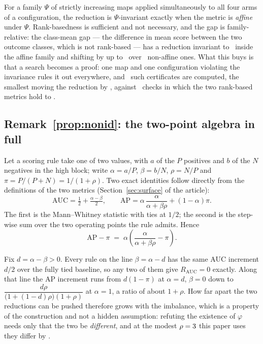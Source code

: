 \begin{remark}
\label{prop:rank}
For a family $\Psi$ of strictly increasing maps applied simultaneously to all
four arms of a configuration, the reduction is $\Psi$-invariant exactly when
the metric is \emph{affine} under $\Psi$. Rank-basedness is sufficient and not
necessary, and the gap is family-relative: the class-mean gap --- the
difference in mean score between the two outcome classes, which is not
rank-based --- has a reduction invariant to \widerRShiftAffine\ inside the
affine family and shifting by up to \widerRShiftNonAffine\ over
\nPsiFamiliesNonAffine\ non-affine ones. What this buys is that a search
becomes a proof: one map and one configuration violating the invariance rules
it out everywhere, and \nCertificates\ such certificates are computed, the
smallest moving the reduction by \certificateMinShift, against
\nInvarianceChecks\ checks in which the two rank-based metrics hold to
\invarianceMaxShift.
\end{remark}

\subsection*{Remark~\ref{prop:nonid}: the two-point algebra in full}

Let a scoring rule take one of two values, with $a$ of the $P$ positives and
$b$ of the $N$ negatives in the high block; write $\alpha = a/P$,
$\beta = b/N$, $\rho = N/P$ and $\pi = P/(P+N) = 1/(1+\rho)$. Two exact
identities follow directly from the definitions of the two metrics
(Section~\ref{sec:surface} of the article):
\[
\mathrm{AUC} = \tfrac12 + \tfrac{\alpha - \beta}{2},
\qquad
\mathrm{AP} = \alpha\,\frac{\alpha}{\alpha + \beta\rho} + (1-\alpha)\pi .
\]
The first is the Mann--Whitney statistic with ties at $1/2$; the second is the
step-wise sum over the two operating points the rule admits. Hence
\[
\mathrm{AP} - \pi \;=\; \alpha\left(\frac{\alpha}{\alpha + \beta\rho} -
\pi\right).
\]

Fix $d = \alpha - \beta > 0$. Every rule on the line $\beta = \alpha - d$ has
the same AUC increment $d/2$ over the fully tied baseline, so any two of them
give $R_{\mathrm{AUC}} = 0$ exactly. Along that line the AP increment runs
from $d(1-\pi)$ at $\alpha = d$, $\beta = 0$ down to
$\dfrac{d\rho}{\bigl(1 + (1-d)\rho\bigr)(1+\rho)}$ at $\alpha = 1$, a ratio of
about $1 + \rho$. How far apart the two reductions can be pushed therefore
grows with the imbalance, which is a property of the construction and not a
hidden assumption: refuting the existence of $\varphi$ needs only that the two
be \emph{different}, and at the modest $\rho = 3$ this paper uses
they differ by \propOneApGap.

